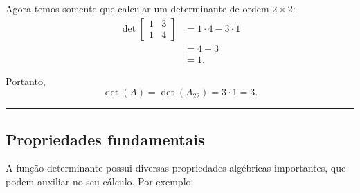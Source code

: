 Agora temos somente que calcular um determinante de ordem $2\times 2$:
\begin{align*}
\det\begin{bmatrix} 1&3\\1&4\end{bmatrix}
&=1\cdot 4-3\cdot 1\\
&=4-3\\
&=1.
\end{align*}

Portanto,
\[\det(A)=\det(A_{22})=3\cdot 1=3.\]

\hrule

\subsection*{Propriedades fundamentais}
A função determinante possui diversas propriedades algébricas importantes, que podem auxiliar no seu cálculo. Por exemplo:

